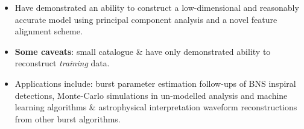 \documentclass[a0,landscape]{a0poster}
\begin{document}
\begin{multicols}{4}
\begin{itemize}
\item Have demonstrated an ability to construct a low-dimensional and reasonably
    accurate model using principal component analysis and a novel feature
    alignment scheme.
\item {\bf Some caveats}: small catalogue \& have only demonstrated ability to
    reconstruct \emph{training} data.
\item Applications include: burst parameter estimation follow-ups of BNS inspiral
    detections, Monte-Carlo simulations in un-modelled analysis
    and machine learning algorithms \& astrophysical interpretation waveform
    reconstructions from other burst algorithms.
\end{itemize}




\footnotesize{
}





\end{multicols}
\end{document}
